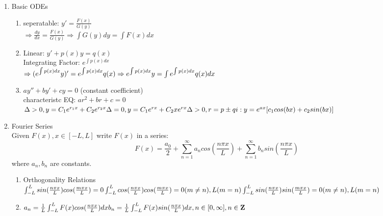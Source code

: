 \documentclass[10pt]{article}
\newcommand{\Z}{\mathbf{Z}}
\begin{document}
  
\begin{multicols}{2}
	
\begin{enumerate}
	\item Basic ODEs
	\begin{enumerate}
		\item seperatable: $y'= \frac{F(x)}{G(y)}$\\
		$\Rightarrow \frac{dy}{dx} = \frac{F(x)}{G(y)} \Rightarrow \int G(y)dy = \int F(x)dx$
		
		\item Linear: $y'+p(x)y = q(x)$\\
		Integrating Factor: $e^{\int p(x)dx}$\\
		$\Rightarrow (e^{\int p(x)dx}y)' = e^{\int p(x)dx}q(x)\\ \Rightarrow
		e^{\int p(x)dx}y = \int e^{\int p(x)dx}q(x)dx$
		
		\item $ay'' + by' + cy = 0$ (constant coefficient)\\
		characteristc EQ: $ar^2 + br + c = 0$\\
		$\Delta > 0, y = C_1e^{r_1x} + C_2e^{r_2x}\\
		\Delta = 0, y = C_1e^{rx} + C_2xe^{rx}\\
		\Delta > 0, r = p \pm qi: y = e^{ax}[c_1cos(bx)+c_2sin(bx)]\\$ 
	\end{enumerate}

	\item Fourier Series\\
	Given $F(x), x\in [-L,L]$ write $F(x)$ in a series:
	$$F(x) = \frac{a_0}{2} + \sum_{n = 1}^{\infty}a_n cos(\frac{n\pi x}{L}) + \sum_{n = 1}^{\infty}b_n sin(\frac{n\pi x}{L})$$ where $a_n, b_n$ are constants.
	\begin{enumerate}
		\item  Orthogonality Relations\\
		$\int_{-L}^{L}sin(\frac{n\pi x}{L})cos(\frac{m\pi x}{L}) = 0\\
		\int_{-L}^{L}cos(\frac{n\pi x}{L})cos(\frac{m\pi x}{L}) = 0(m \neq n), L(m = n)\\
		\int_{-L}^{L}sin(\frac{n\pi x}{L})sin(\frac{m\pi x}{L}) = 0(m \neq n), L(m = n)$
		
		\item $a_n = \frac{1}{L}\int_{-L}^{L}F(x)cos(\frac{n\pi x}{L})dx\\
		b_n = \frac{1}{L}\int_{-L}^{L}F(x)sin(\frac{n\pi x}{L})dx, n \in [0, \infty], n \in \Z$
		

\end{enumerate}
\end{enumerate}
\end{multicols}
\end{document}

